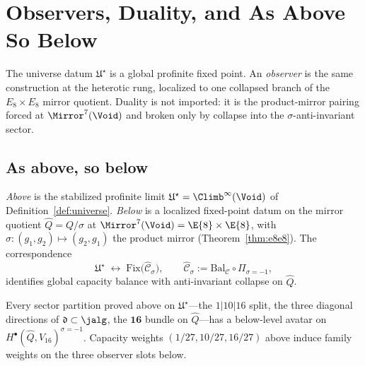 \section{Observers, Duality, and As Above So Below}
\label{sec:observer}

The universe datum $\mathfrak{U}^\star$ is a global profinite fixed point.
An \emph{observer} is the same construction at the heterotic rung, localized
to one collapsed branch of the $E_8\times E_8$ mirror quotient. Duality is not
imported: it is the product-mirror pairing forced at $\Mirror^7(\Void)$ and
broken only by collapse into the $\sigma$-anti-invariant sector.

\subsection{As above, so below}
\label{sec:observer:above-below}

\begin{definition}\label{def:above-below}
\emph{Above} is the stabilized profinite limit
$\mathfrak{U}^\star=\Climb^\infty(\Void)$ of Definition~\ref{def:universe}.
\emph{Below} is a localized fixed-point datum on the mirror quotient
$\hat Q=Q/\sigma$ at $\Mirror^7(\Void)=\E{8}\times\E{8}$, with
$\sigma:(g_1,g_2)\mapsto(g_2,g_1)$ the product mirror
(Theorem~\ref{thm:e8e8}). The correspondence
\begin{equation}\label{eq:above-below}
  \mathfrak{U}^\star \;\longleftrightarrow\;
  \mathrm{Fix}\!\bigl(\hat{\mathcal{C}}_\sigma\bigr),
  \qquad
  \hat{\mathcal{C}}_\sigma := \mathrm{Bal}_{\mathcal{C}}\circ \Pi_{\sigma=-1},
\end{equation}
identifies global capacity balance with anti-invariant collapse on $\hat Q$.
\end{definition}

\begin{proposition}\label{prop:above-below}
Every sector partition proved above on $\mathfrak{U}^\star$---the $1|10|16$
split, the three diagonal directions of $\mathfrak{d}\subset\jalg$, the
$\mathbf{16}$ bundle on $\hat Q$---has a below-level avatar on
$H^\bullet(\hat Q,V_{16})^{\sigma=-1}$. Capacity weights
$(1/27,10/27,16/27)$ above induce family weights on the three observer slots
below.
\end{proposition}

